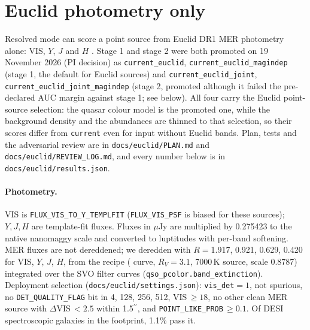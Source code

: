 \documentclass[11pt,a4paper]{article}
\newcommand{\code}[1]{\texttt{#1}}
\begin{document}
\section{Euclid photometry only}\label{sec:euclid}
Resolved mode can score a point source from Euclid DR1 MER photometry alone: VIS, $Y$, $J$ and $H$
\citep{EuclidQ1MER,EuclidDR1MER}. Stage 1 and stage 2 were both promoted on 19 November 2026 (PI decision) as
\code{current\_euclid}, \code{current\_euclid\_magindep} (stage 1, the default for Euclid sources) and
\code{current\_euclid\_joint}, \code{current\_euclid\_joint\_magindep} (stage 2, promoted although it failed
the pre-declared AUC margin against stage 1; see below). All four carry the Euclid point-source selection: the quasar
colour model is the promoted one, while the background density and the abundances are thinned to that selection, so
their scores differ from \code{current} even for input without Euclid bands. Plan, tests and the
adversarial review are in \code{docs/euclid/PLAN.md} and \code{docs/euclid/REVIEW\_LOG.md}, and every number below is
in \code{docs/euclid/results.json}.

\paragraph{Photometry.} VIS is \code{FLUX\_VIS\_TO\_Y\_TEMPLFIT} (\code{FLUX\_VIS\_PSF} is biased for these
sources); $Y,J,H$ are template-fit fluxes. Fluxes in $\mu$Jy are multiplied by 0.275423 to the native
nanomaggy scale and converted to luptitudes with per-band softening. MER fluxes are not dereddened; we
deredden with $R={}$1.917, 0.921, 0.629, 0.420 for VIS, $Y$, $J$, $H$, from the \citet{SF11} recipe
(\citet{Fitzpatrick1999} curve, $R_V=3.1$, 7000\,K source, scale 0.8787) integrated over the SVO filter curves
(\code{qso\_pcolor.band\_extinction}). Deployment selection (\code{docs/euclid/settings.json}): \code{vis\_det}$=1$,
not spurious, no \code{DET\_QUALITY\_FLAG} bit in 4, 128, 256, 512, VIS$\,\geq18$, no other clean MER source with
$\Delta$VIS$\,<2.5$ within 1.5$^{\prime\prime}$, and \code{POINT\_LIKE\_PROB}$\,\geq0.1$. Of DESI spectroscopic galaxies in the
footprint, 1.1\% pass it.
\end{document}
